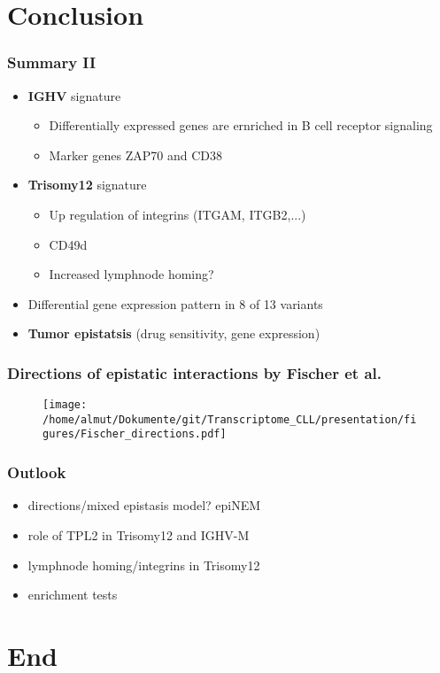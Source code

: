 \documentclass[xcolor=dvipsnames,t,10pt]{beamer}
\begin{document}
\section{Conclusion}
%
%
\begin{frame}[c]
	\frametitle{Summary II}
	\begin{itemize}
		\item \textbf{IGHV} signature
		\begin{itemize}
			\item Differentially expressed genes are ernriched in B cell receptor signaling
			\item Marker genes ZAP70 and CD38 
		\end{itemize}
		\item \textbf{Trisomy12} signature
		\begin{itemize}
			\item Up regulation of integrins (ITGAM, ITGB2,...)
			\item CD49d
			\item Increased lymphnode homing?
		\end{itemize} 
		\item Differential gene expression pattern in 8 of 13 variants
		\item \textbf{Tumor epistatsis} (drug sensitivity, gene expression)
	\end{itemize}
\end{frame}
%  
%
\begin{frame}[c]
	\frametitle{Directions of epistatic interactions by Fischer et al.}
	\begin{figure}
		\centering
		\texttt{[image: /home/almut/Dokumente/git/Transcriptome\_CLL/presentation/figures/Fischer\_directions.pdf]}
	\end{figure}
\end{frame}
%
%
\begin{frame}[c]
	\frametitle{Outlook}
	\begin{itemize}
		\item directions/mixed epistasis model? epiNEM
		\item role of TPL2 in Trisomy12 and IGHV-M
		\item lymphnode homing/integrins in Trisomy12
		\item enrichment tests 
	\end{itemize}
\end{frame}

\section{End}
\end{document}
